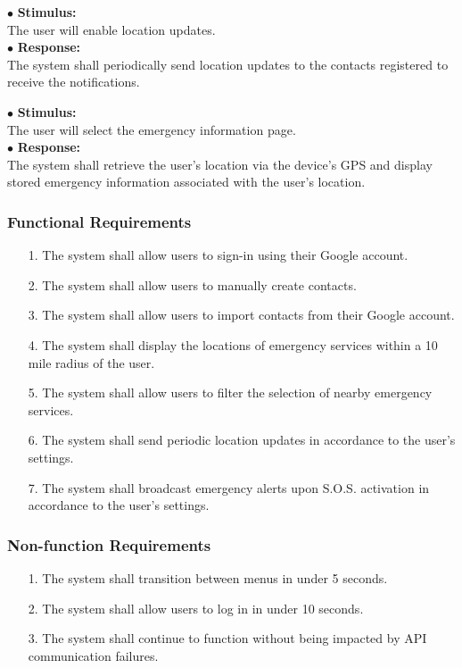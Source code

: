 \documentclass{scrreprt}
\begin{document}
\vspace{5mm}
	\hspace{-4.75mm} $\bullet$ \textbf{Stimulus:} \\ \hspace{5mm} The user will enable location updates.\\
	$\bullet$ \textbf{Response:} \\ \hspace{5mm} The system shall periodically send location updates to the contacts registered to receive the notifications.
	
\vspace{5mm}
	\hspace{-4.75mm} $\bullet$ \textbf{Stimulus:} \\ \hspace{5mm} The user will select the emergency information page.\\
	$\bullet$ \textbf{Response:} \\ \hspace{5mm} The system shall retrieve the user's location via the device's GPS and display stored emergency information associated with the user's location.


\subsubsection{Functional Requirements}
\begin{enumerate}
	\item[1.] The system shall allow users to sign-in using their Google account.
	\item[2.] The system shall allow users to manually create contacts.
	\item[3.] The system shall allow users to import contacts from their Google account.
	\item[4.] The system shall display the locations of emergency services within a 10 mile radius of the user.
	\item[5.] The system shall allow users to filter the selection of nearby emergency services.
	\item[6.] The system shall send periodic location updates in accordance to the user's settings.
	\item[7.] The system shall broadcast emergency alerts upon S.O.S. activation in accordance to the user's settings.
\end{enumerate}

\subsubsection{Non-function Requirements}
\begin{enumerate}
	\item[1.] The system shall transition between menus in under 5 seconds.
	\item[2.] The system shall allow users to log in in under 10 seconds.
	\item[3.] The system shall continue to function without being impacted by API communication failures.
\end{enumerate}
\end{document}
